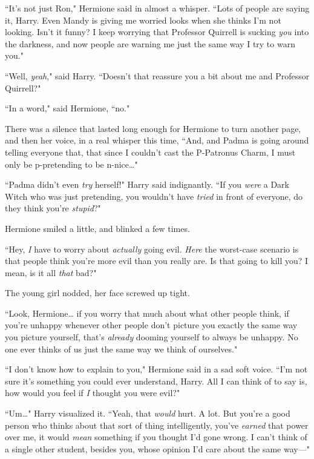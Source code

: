 ``It's not just Ron," Hermione said in almost a whisper. ``Lots of people are saying it, Harry. Even Mandy is giving me worried looks when she thinks I'm not looking. Isn't it funny? I keep worrying that Professor Quirrell is sucking \emph{you} into the darkness, and now people are warning me just the same way I try to warn you."

``Well, \emph{yeah}," said Harry. ``Doesn't that reassure you a bit about me and Professor Quirrell?"

``In a word," said Hermione, ``no."

There was a silence that lasted long enough for Hermione to turn another page, and then her voice, in a real whisper this time, ``And, and Padma is going around telling everyone that, that since I couldn't cast the P-Patronus Charm, I must only be p-pretending to be n-nice{\ldots}"

``Padma didn't even \emph{try} herself!" Harry said indignantly. ``If you \emph{were} a Dark Witch who was just pretending, you wouldn't have \emph{tried} in front of everyone, do they think you're \emph{stupid}?"

Hermione smiled a little, and blinked a few times.

``Hey, \emph{I} have to worry about \emph{actually} going evil. \emph{Here} the worst-case scenario is that people think you're more evil than you really are. Is that going to kill you? I mean, is it all \emph{that} bad?"

The young girl nodded, her face screwed up tight.

``Look, Hermione{\ldots} if you worry that much about what other people think, if you're unhappy whenever other people don't picture you exactly the same way you picture yourself, that's \emph{already} dooming yourself to always be unhappy. No one ever thinks of us just the same way we think of ourselves."

``I don't know how to explain to you," Hermione said in a sad soft voice. ``I'm not sure it's something you could ever understand, Harry. All I can think of to say is, how would you feel if \emph{I} thought you were evil?"

``Um{\ldots}" Harry visualized it. ``Yeah, that \emph{would} hurt. A lot. But you're a good person who thinks about that sort of thing intelligently, you've \emph{earned} that power over me, it would \emph{mean} something if you thought I'd gone wrong. I can't think of a single other student, besides you, whose opinion I'd care about the same way---"

